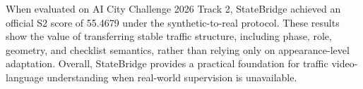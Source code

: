 \documentclass[runningheads]{llncs}
\begin{document}
When evaluated on AI City Challenge 2026 Track 2, StateBridge achieved an official S2 score of 55.4679 under the synthetic-to-real protocol. These results show the value of transferring stable traffic structure, including phase, role, geometry, and checklist semantics, rather than relying only on appearance-level adaptation. Overall, StateBridge provides a practical foundation for traffic video-language understanding when real-world supervision is unavailable.


%
%
\clearpage


\end{document}
